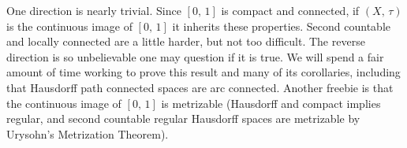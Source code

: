 \documentclass{article}
\theoremstyle{plain}
\theoremstyle{normal}
\begin{document}
        One direction is nearly trivial. Since $[0,\,1]$ is compact and
        connected, if $(X,\,\tau)$ is the continuous image of $[0,\,1]$ it
        inherits these properties. Second countable and locally connected are
        a little harder, but not too difficult. The
        reverse direction is so unbelievable one may question if it is true.
        We will spend a fair amount of time working to prove this result and
        many of its corollaries, including that Hausdorff path connected spaces
        are arc connected. Another freebie is that the continuous image of
        $[0,\,1]$ is metrizable (Hausdorff and compact implies regular,
        and second countable regular Hausdorff spaces are metrizable by
        Urysohn's Metrization Theorem).
    \printindex
\end{document}
